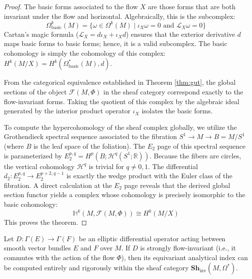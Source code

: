 \begin{proof}
The basic forms associated to the flow $X$ are those forms that are both invariant under the flow and horizontal. Algebraically, this is the subcomplex:
\[ \Omega_{\text{basic}}^k(M) = \{ \omega \in \Omega^k(M) \mid \iota_X \omega = 0 \text{ and } \mathcal{L}_X \omega = 0 \} \]
Cartan's magic formula ($\mathcal{L}_X = d\iota_X + \iota_X d$) ensures that the exterior derivative $d$ maps basic forms to basic forms; hence, it is a valid subcomplex. The basic cohomology is simply the cohomology of this complex: $H^k(M/X) = H^k(\Omega_{\text{basic}}^*(M), d)$.

From the categorical equivalence established in Theorem \ref{thm:gut}, the global sections of the object $\mathcal{F}(M, \Phi)$ in the sheaf category correspond exactly to the flow-invariant forms. Taking the quotient of this complex by the algebraic ideal generated by the interior product operator $\iota_X$ isolates the basic forms. 

To compute the hypercohomology of the sheaf complex globally, we utilize the Grothendieck spectral sequence associated to the fibration $S^1 \to M \to B = M/S^1$ (where $B$ is the leaf space of the foliation). The $E_2$ page of this spectral sequence is parameterized by $E_2^{p,q} = H^p(B; \mathcal{H}^q(S^1; \mathbb{R}))$. Because the fibers are circles, the vertical cohomology $\mathcal{H}^q$ is trivial for $q \neq 0, 1$. The differential $d_2: E_2^{p,q} \to E_2^{p+2, q-1}$ is exactly the wedge product with the Euler class of the fibration. A direct calculation at the $E_2$ page reveals that the derived global section functor yields a complex whose cohomology is precisely isomorphic to the basic cohomology:
\[ \mathbb{H}^k(M, \mathcal{F}(M, \Phi)) \cong H^k(M/X) \]
This proves the theorem.
\end{proof}

\begin{theorem}
Let $D: \Gamma(E) \to \Gamma(F)$ be an elliptic differential operator acting between smooth vector bundles $E$ and $F$ over $M$. If $D$ is strongly flow-invariant (i.e., it commutes with the action of the flow $\Phi$), then its equivariant analytical index can be computed entirely and rigorously within the sheaf category $\mathbf{Sh}_{\text{inv}}(M, \Omega^*)$.
\end{theorem}

